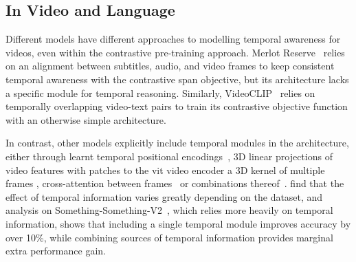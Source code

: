 
\subsection{In Video and Language}
\label{ssec:tempvidlm}

Different models have different approaches to modelling temporal awareness for
videos, even within the contrastive pre-training approach. Merlot
Reserve~\citep{zellers2022mreserve} relies on an alignment between subtitles,
audio, and video frames to keep consistent temporal awareness with the
contrastive span objective, but its architecture lacks a specific module for
temporal reasoning. Similarly, VideoCLIP~\citep{xu2021videoclip} relies on
temporally overlapping video-text pairs to train its contrastive objective
function with an otherwise simple architecture.

In contrast, other models explicitly include temporal modules in the
architecture, either through learnt temporal positional
encodings~\citep{alayrac2022flamingo}, 3D linear projections %
of video features with patches to the \acrshort{vit} video encoder a 3D kernel of multiple frames
, cross-attention between
frames~\citep{li2023lavender} or combinations
thereof~\citep{lin2022evl,bain2021frozen}. \citet{lin2022evl} find that the
effect of temporal information varies greatly depending on the dataset, and
analysis on Something-Something-V2~\citep{goyal2017something}, which relies
more heavily on temporal information, shows that including a single temporal
module improves accuracy by over 10\%, while combining sources of temporal
information provides marginal extra performance gain.


